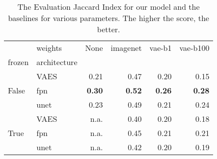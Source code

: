 \begin{table}[ht]
\centering
\caption{The Evaluation Jaccard Index for our model and the baselines for various parameters. The higher the score, the better.}
\label{tab:baseline_results}
\begin{tabular}{llrrrr}
\toprule
 & weights & None & imagenet & vae-b1 & vae-b100 \\
frozen & architecture &  &  &  &  \\
\midrule
\multirow[t]{3}{*}{False} & VAES & 0.21 & 0.47 & 0.20 & 0.15 \\
 & fpn & \textbf{0.30} & \textbf{0.52} & \textbf{0.26} & \textbf{0.28} \\
 & unet & 0.23 & 0.49 & 0.21 & 0.24 \\
\cline{1-6}
\multirow[t]{3}{*}{True} & VAES & n.a. & 0.40 & 0.20 & 0.18 \\
 & fpn & n.a. & 0.45 & 0.21 & 0.21 \\
 & unet & n.a. & 0.42 & 0.20 & 0.19 \\
\cline{1-6}
\bottomrule
\end{tabular}
\end{table}
